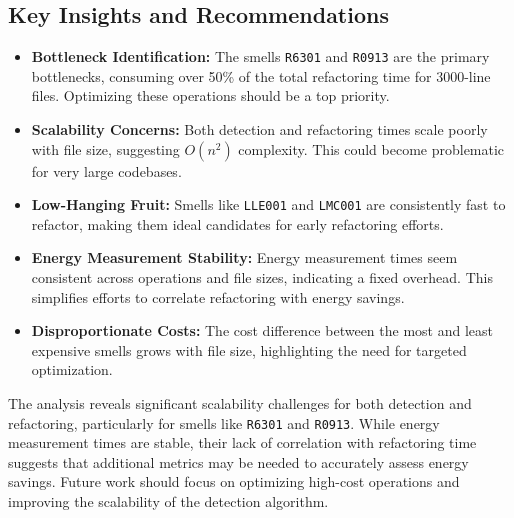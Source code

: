 \documentclass[12pt, titlepage]{article}
\begin{document}
\subsection*{Key Insights and Recommendations}
\begin{itemize}
  \item \textbf{Bottleneck Identification:} The smells \texttt{R6301}
    and \texttt{R0913} are the primary bottlenecks, consuming over
    50\% of the total refactoring time for 3000-line files.
    Optimizing these operations should be a top priority.
  \item \textbf{Scalability Concerns:} Both detection and refactoring
    times scale poorly with file size, suggesting \(O(n^2)\)
    complexity. This could become problematic for very large codebases.
  \item \textbf{Low-Hanging Fruit:} Smells like \texttt{LLE001} and
    \texttt{LMC001} are consistently fast to refactor, making them
    ideal candidates for early refactoring efforts.
  \item \textbf{Energy Measurement Stability:} Energy measurement
    times seem consistent across operations and file sizes,
    indicating a fixed overhead. This simplifies efforts to correlate
    refactoring with energy savings.
  \item \textbf{Disproportionate Costs:} The cost difference between
    the most and least expensive smells grows with file size,
    highlighting the need for targeted optimization.
\end{itemize}

The analysis reveals significant scalability challenges for both
detection and refactoring, particularly for smells like
\texttt{R6301} and \texttt{R0913}. While energy measurement times are
stable, their lack of correlation with refactoring time suggests that
additional metrics may be needed to accurately assess energy savings.
Future work should focus on optimizing high-cost operations and
improving the scalability of the detection algorithm.
\end{document}

